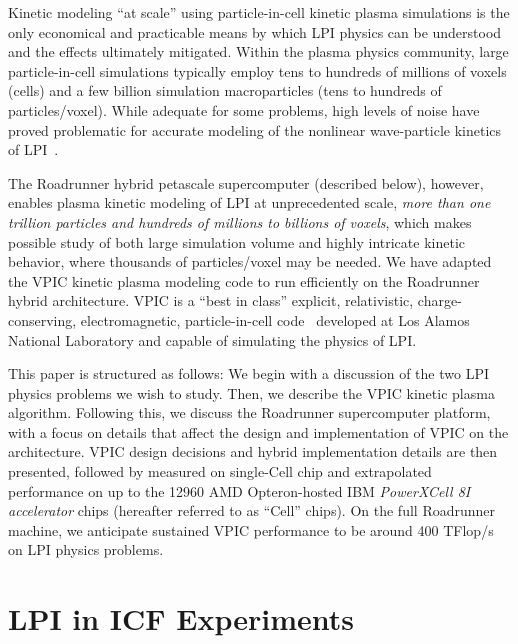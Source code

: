 \documentclass[10pt]{article}
\begin{document}
Kinetic modeling ``at scale'' using particle-in-cell kinetic plasma simulations is 
the only economical and practicable means by which LPI physics can be understood 
and the effects ultimately mitigated.  
Within the plasma physics community, large particle-in-cell simulations 
typically employ tens to hundreds of millions of voxels (cells) and a few 
billion simulation macroparticles (tens to hundreds of particles/voxel).  
While adequate for some problems, high levels of noise have proved problematic 
for accurate modeling of the nonlinear wave-particle kinetics of LPI~\cite{}.  

The Roadrunner hybrid petascale supercomputer (described below), however, 
enables plasma kinetic modeling of LPI at unprecedented 
scale, \textit{more than one trillion particles and hundreds of millions 
to billions of voxels}, which makes possible study of both large simulation 
volume and highly intricate kinetic behavior, where thousands of particles/voxel 
may be needed.  
We have adapted the VPIC kinetic plasma modeling code to run efficiently on the
Roadrunner hybrid architecture.  VPIC is a ``best in class'' explicit, relativistic, 
charge-conserving, electromagnetic, particle-in-cell code~\cite{} developed at
Los Alamos National Laboratory and capable of simulating the physics of LPI. 

This paper is structured as follows:  We begin with a discussion of the two LPI 
physics problems we wish to study.  Then, we describe the VPIC 
kinetic plasma algorithm.  Following this, we discuss the Roadrunner supercomputer platform, 
with a focus on details that affect the design and implementation of
VPIC on the architecture.   VPIC design decisions and hybrid implementation details 
are then presented, followed by measured on single-Cell chip and extrapolated performance 
on up to the 12960 AMD Opteron-hosted IBM \emph{PowerXCell 8I accelerator} chips (hereafter 
referred to as ``Cell'' chips).  On the full Roadrunner machine, we anticipate 
sustained VPIC performance to be around 400 TFlop/s on LPI physics problems. 



\section*{LPI in ICF Experiments}
\end{document}
